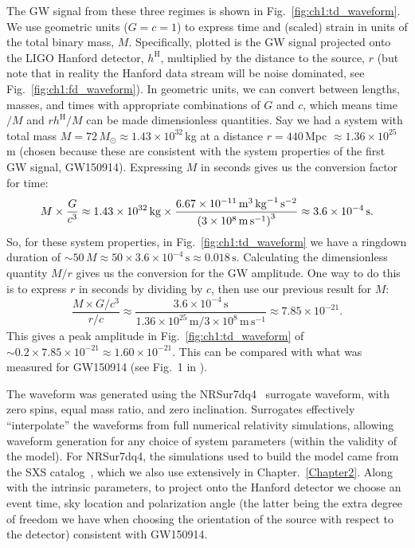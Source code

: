 The GW signal from these three regimes is shown in Fig.~\ref{fig:ch1:td_waveform}.
We use geometric units ($G = c = 1$) to express time and (scaled) strain in units of the total binary mass, $M$. 
Specifically, plotted is the GW signal projected onto the LIGO Hanford detector, $h^\mathrm{H}$, multiplied by the distance to the source, $r$ (but note that in reality the Hanford data stream will be noise dominated, see Fig.~\ref{fig:ch1:fd_waveform}).
In geometric units, we can convert between lengths, masses, and times with appropriate combinations of $G$ and $c$, which means time$/M$ and $rh^\mathrm{H}/M$ can be made dimensionless quantities. 
Say we had a system with total mass $M = 72\, M_\odot \approx 1.43 \times 10^{32}\,$kg at a distance $r = 440\,$Mpc $\approx 1.36 \times 10^{25}\,$m (chosen because these are consistent with the system properties of the first GW signal, GW150914). 
Expressing $M$ in seconds gives us the conversion factor for time:
\begin{equation}
    M \times \frac{G}{c^3} \approx 1.43 \times 10^{32}\, \mathrm{kg} \times \frac{6.67 \times 10^{-11}\, \mathrm{m}^3\, \mathrm{kg}^{-1}\, \mathrm{s}^{-2}}{\qty(3 \times 10^8\, \mathrm{m}\, \mathrm{s}^{-1})^3} \approx 3.6 \times 10^{-4}\, \mathrm{s}.
\end{equation}
So, for these system properties, in Fig.~\ref{fig:ch1:td_waveform} we have a ringdown duration of $\sim 50\, M \approx 50 \times 3.6 \times 10^{-4}\, \mathrm{s} \approx 0.018\, \mathrm{s}$. 
Calculating the dimensionless quantity $M/r$ gives us the conversion for the GW amplitude. 
One way to do this is to express $r$ in seconds by dividing by $c$, then use our previous result for $M$:
\begin{equation}
    \frac{M \times G/c^3}{r/c} \approx \frac{3.6 \times 10^{-4}\, \mathrm{s}}{1.36 \times 10^{25}\, \mathrm{m}/3 \times 10^8\, \mathrm{m}\, \mathrm{s}^{-1}} \approx 7.85 \times 10^{-21}.
\end{equation}
This gives a peak amplitude in Fig.~\ref{fig:ch1:td_waveform} of $\sim 0.2 \times 7.85 \times 10^{-21} \approx 1.60 \times 10^{-21}$. 
This can be compared with what was measured for GW150914 (see Fig.~1 in \cite{LIGOScientific:2016aoc}).

The waveform was generated using the NRSur7dq4~\cite{Varma:2019csw} surrogate waveform, with zero spins, equal mass ratio, and zero inclination. 
Surrogates effectively ``interpolate'' the waveforms from full numerical relativity simulations, allowing waveform generation for any choice of system parameters (within the validity of the model). 
For NRSur7dq4, the simulations used to build the model came from the SXS catalog~\cite{sxs_catalog}, which we also use extensively in Chapter.~\ref{Chapter2}. 
Along with the intrinsic parameters, to project onto the Hanford detector we choose an event time, sky location and polarization angle (the latter being the extra degree of freedom we have when choosing the orientation of the source with respect to the detector) consistent with GW150914. 

